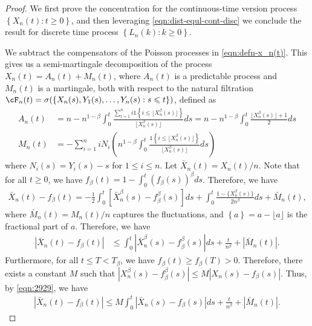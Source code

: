 \documentclass[letterpaper,11pt,reqno]{amsart}
\theoremstyle{definition}
\renewcommand{\leq}{\leqslant}
\renewcommand{\geq}{\geqslant}
\newcommand{\ind}{\mathds{1}}
\newcommand{\abs}[1]{\left\vert#1\right\vert}
\newcommand{\set}[1]{\left\{#1\right\}}
\begin{document}
\begin{proof}
   We first prove the concentration for the continuous-time version process $\set{X_n(t):t\geq 0}$, and then leveraging \eqref{eqn:dist-equl-cont-disc} we conclude the result for discrete time process $\set{L_n(k):k\geq 0}.$ 
   
   
   We subtract the compensators of the Poisson processes in \eqref{eqn:defn-x_n(t)}. This gives us a semi-martingale decomposition of the process $X_n(t) = A_n(t) + M_n(t)$, where $A_n(t)$ is a predictable process and $M_n(t)$ is a martingale, both with respect to the natural filtration $\cF_n(t)=\sigma(\set{X_n(s),Y_1(s),\dots,Y_n(s):s\leq t})$, defined as\begin{align*}
        A_n(t) &= n- n^{1-\beta} \int_{0}^t \frac{\sum_{i=1}^n i\ind\set{i\leq \lfloor X_n^\beta(s)\rfloor}}{\lfloor X_n^\beta(s)\rfloor} ds = n-n^{1-\beta}\int_{0}^t \frac{\lfloor X_n^\beta(s)\rfloor + 1}{2} ds\\
        M_n(t) &= -\sum_{i=1}^n iN_i\left(n^{1-\beta}\int_{0}^t \frac{\ind\set{i\leq \lfloor X_n^\beta(s)\rfloor }}{\lfloor X_n^\beta(s)\rfloor}ds\right)
    \end{align*} where $N_i(s) = Y_i(s) - s$ for $1\leq i\leq n$. Let $\bar{X}_n(t) = X_n(t)/n$. Note that for all $t\geq 0$, we have $f_\beta(t) = 1 - \int_{0}^t (f_{\beta}(s))^\beta ds$. Therefore, we have \begin{align*}
        \bar{X}_n(t) - f_{\beta}(t) = -\frac{1}{2}\int_{0}^t \left[\bar{X}_n^\beta(s) - f_{\beta}^\beta(s)\right]ds + \int_{0}^t \frac{1-\{X_n^\beta(s)\}}{2n^\beta}ds + \bar{M}_n(t),
    \end{align*} where $\bar{M}_n(t) = M_n(t)/n$ captures the fluctuations, and $\set{a} = a-\lfloor a \rfloor $ is the fractional part of $a$. Therefore, we have \begin{align}\label{eqn:2929}
        \abs{\bar{X}_n(t) - f_{\beta}(t)} &\leq \int_0^t \abs{\bar{X}_n^\beta(s) - f_{\beta}^\beta(s)} ds + \frac{t}{n^{\beta}} + |\bar{M}_n(t)|.
    \end{align} Furthermore, for all $t \leq T < T_\beta$, we have $f_{\beta}(t) \geq f_{\beta}(T) > 0$. Therefore, there exists a constant $M$ such that $\abs{X_{n}^\beta(s)-f_{\beta}^\beta(s)} \leq M \abs{X_{n}(s)-f_{\beta}(s)}$. Thus, by \eqref{eqn:2929}, we have \begin{align*}
        \abs{\bar{X}_n(t)-f_\beta(t)} \leq M \int_0^t \abs{\bar{X}_n(s) - f_{\beta}(s)} ds + \frac{t}{n^{\beta}} + |\bar{M}_n(t)|.
    \end{align*}

\end{proof}
\end{document}
